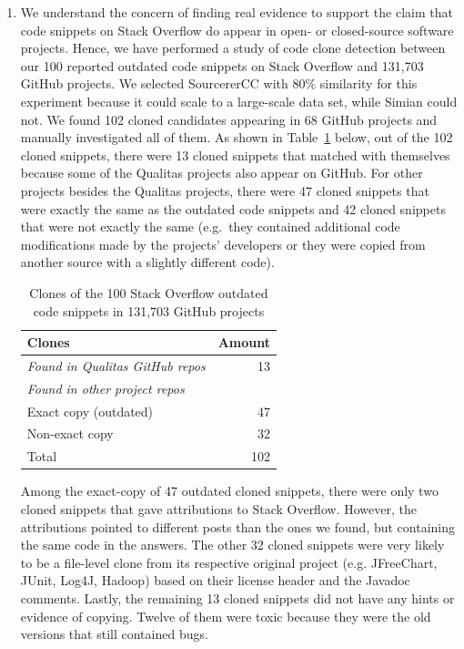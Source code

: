 \documentclass[a4paper,twoside,10pt]{reviewresponse}
\begin{document}
\begin{enumerate}
	\item We understand the concern of finding real evidence to support the claim that code snippets on Stack Overflow do appear in open- or closed-source software projects. Hence, we have performed a study of code clone detection between our 100 reported outdated code snippets on Stack Overflow and 131,703 GitHub projects. We selected SourcererCC with 80\% similarity for this experiment because it could scale to a large-scale data set, while Simian could not. We found 102 cloned candidates appearing in 68 GitHub projects and manually investigated all of them. As shown in Table~\ref{tab:outdated_github} below, out of the 102 cloned snippets, there were 13 cloned snippets that matched with themselves because some of the Qualitas projects also appear on GitHub. For other projects besides the Qualitas projects, there were 47 cloned snippets that were exactly the same as the outdated code snippets and 42 cloned snippets that were not exactly the same (e.g.~they contained additional code modifications made by the projects' developers or they were copied from another source with a slightly different code). 
	
	\begin{table}[H]
		\centering
		\begin{tabular}{lr}
			\toprule
			Clones & Amount \\
			\midrule
			\textit{Found in Qualitas GitHub repos} & 13 \\
			\midrule
			\textit{Found in other project repos} & \\
			Exact copy (outdated) & 47 \\
			Non-exact copy & 32 \\
			\midrule
			Total & 102 \\
			\bottomrule
		\end{tabular}
		\label{tab:outdated_github}
		\caption{Clones of the 100 Stack Overflow outdated code snippets in 131,703 GitHub projects}
	\end{table}

	Among the exact-copy of 47 outdated cloned snippets, there were only two cloned snippets that gave attributions to Stack Overflow. However, the attributions pointed to different posts than the ones we found, but containing the same code in the answers. The other 32 cloned snippets were very likely to be a file-level clone from its respective original project (e.g. JFreeChart, JUnit, Log4J, Hadoop) based on their license header and the Javadoc comments. Lastly, the remaining 13 cloned snippets did not have any hints or evidence of copying.
	Twelve of them were toxic because they were the old versions that still contained bugs.
	

\end{enumerate}
\end{document}

